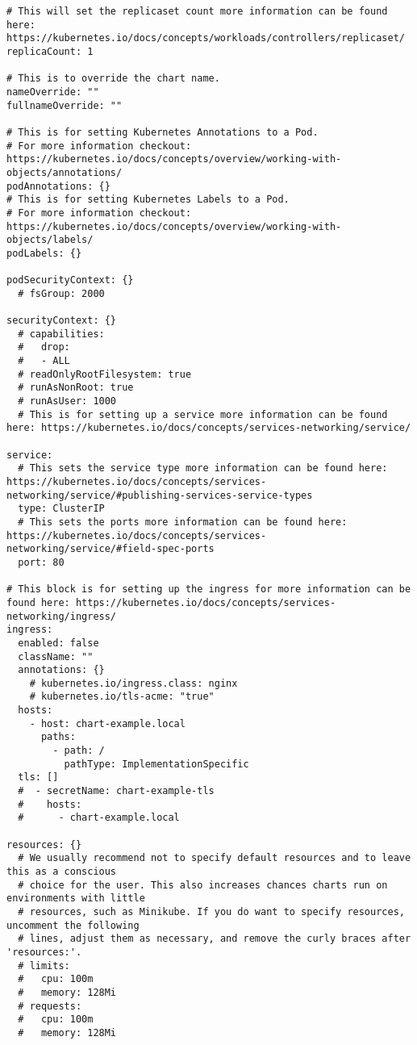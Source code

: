 \documentclass[english]{scrbook}
\begin{document}
\begingroup
\centering
\label{figure:values.yaml}
\begin{singlespace}
\begin{verbatim}
# This will set the replicaset count more information can be found here: https://kubernetes.io/docs/concepts/workloads/controllers/replicaset/
replicaCount: 1

# This is to override the chart name.
nameOverride: ""
fullnameOverride: ""

# This is for setting Kubernetes Annotations to a Pod.
# For more information checkout: https://kubernetes.io/docs/concepts/overview/working-with-objects/annotations/ 
podAnnotations: {}
# This is for setting Kubernetes Labels to a Pod.
# For more information checkout: https://kubernetes.io/docs/concepts/overview/working-with-objects/labels/
podLabels: {}

podSecurityContext: {}
  # fsGroup: 2000
  
securityContext: {}
  # capabilities:
  #   drop:
  #   - ALL
  # readOnlyRootFilesystem: true
  # runAsNonRoot: true
  # runAsUser: 1000
  # This is for setting up a service more information can be found here: https://kubernetes.io/docs/concepts/services-networking/service/
  
service:
  # This sets the service type more information can be found here: https://kubernetes.io/docs/concepts/services-networking/service/#publishing-services-service-types
  type: ClusterIP
  # This sets the ports more information can be found here: https://kubernetes.io/docs/concepts/services-networking/service/#field-spec-ports
  port: 80
  
# This block is for setting up the ingress for more information can be found here: https://kubernetes.io/docs/concepts/services-networking/ingress/
ingress:
  enabled: false
  className: ""
  annotations: {}
    # kubernetes.io/ingress.class: nginx
    # kubernetes.io/tls-acme: "true"
  hosts:
    - host: chart-example.local
      paths:
        - path: /
          pathType: ImplementationSpecific
  tls: []
  #  - secretName: chart-example-tls
  #    hosts:
  #      - chart-example.local
  
resources: {}
  # We usually recommend not to specify default resources and to leave this as a conscious
  # choice for the user. This also increases chances charts run on environments with little
  # resources, such as Minikube. If you do want to specify resources, uncomment the following
  # lines, adjust them as necessary, and remove the curly braces after 'resources:'.
  # limits:
  #   cpu: 100m
  #   memory: 128Mi
  # requests:
  #   cpu: 100m
  #   memory: 128Mi
  

\end{verbatim}
\end{singlespace}
\end{document}
